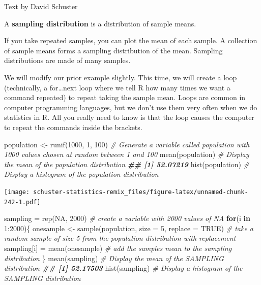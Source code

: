 \documentclass[
]{book}
\newenvironment{Shaded}{\begin{snugshade}}{\end{snugshade}}
\newcommand{\AttributeTok}[1]{\textcolor[rgb]{0.77,0.63,0.00}{#1}}
\newcommand{\CommentTok}[1]{\textcolor[rgb]{0.56,0.35,0.01}{\textit{#1}}}
\newcommand{\ConstantTok}[1]{\textcolor[rgb]{0.00,0.00,0.00}{#1}}
\newcommand{\ControlFlowTok}[1]{\textcolor[rgb]{0.13,0.29,0.53}{\textbf{#1}}}
\newcommand{\DecValTok}[1]{\textcolor[rgb]{0.00,0.00,0.81}{#1}}
\newcommand{\DocumentationTok}[1]{\textcolor[rgb]{0.56,0.35,0.01}{\textbf{\textit{#1}}}}
\newcommand{\FunctionTok}[1]{\textcolor[rgb]{0.00,0.00,0.00}{#1}}
\newcommand{\NormalTok}[1]{#1}
\newcommand{\OtherTok}[1]{\textcolor[rgb]{0.56,0.35,0.01}{#1}}
\newcommand{\SpecialCharTok}[1]{\textcolor[rgb]{0.00,0.00,0.00}{#1}}
\begin{document}
Text by David Schuster

A \textbf{sampling distribution} is a distribution of sample means.

If you take repeated samples, you can plot the mean of each sample. A collection of sample means forms a sampling distribution of the mean. Sampling distributions are made of many samples.

We will modify our prior example slightly. This time, we will create a loop (technically, a for\ldots next loop where we tell R how many times we want a command repeated) to repeat taking the sample mean. Loops are common in computer programming languages, but we don't use them very often when we do statistics in R. All you really need to know is that the loop causes the computer to repeat the commands inside the brackets.

\begin{Shaded}
\begin{Highlighting}[]
\NormalTok{population }\OtherTok{\textless{}{-}} \FunctionTok{runif}\NormalTok{(}\DecValTok{1000}\NormalTok{, }\DecValTok{1}\NormalTok{, }\DecValTok{100}\NormalTok{) }\CommentTok{\# Generate a variable called \textquotesingle{}population\textquotesingle{} with 1000 values chosen at random between 1 and 100}
\FunctionTok{mean}\NormalTok{(population) }\CommentTok{\# Display the mean of the population distribution}
\DocumentationTok{\#\# [1] 52.07219}
\FunctionTok{hist}\NormalTok{(population) }\CommentTok{\# Display a histogram of the population distribution}
\end{Highlighting}
\end{Shaded}

\texttt{[image: schuster-statistics-remix\_files/figure-latex/unnamed-chunk-242-1.pdf]}

\begin{Shaded}
\begin{Highlighting}[]

\NormalTok{sampling }\OtherTok{=} \FunctionTok{rep}\NormalTok{(}\ConstantTok{NA}\NormalTok{, }\DecValTok{2000}\NormalTok{) }\CommentTok{\# create a variable with 2000 values of NA}
\ControlFlowTok{for}\NormalTok{(i }\ControlFlowTok{in} \DecValTok{1}\SpecialCharTok{:}\DecValTok{2000}\NormalTok{)\{}
\NormalTok{  onesample }\OtherTok{\textless{}{-}} \FunctionTok{sample}\NormalTok{(population, }\AttributeTok{size =} \DecValTok{5}\NormalTok{, }\AttributeTok{replace =} \ConstantTok{TRUE}\NormalTok{) }\CommentTok{\# take a random sample of size 5 from the population distribution with replacement  }
\NormalTok{  sampling[i] }\OtherTok{=} \FunctionTok{mean}\NormalTok{(onesample) }\CommentTok{\# add the sample\textquotesingle{}s mean to the sampling distribution}
\NormalTok{\}}
\FunctionTok{mean}\NormalTok{(sampling) }\CommentTok{\# Display the mean of the SAMPLING distribution}
\DocumentationTok{\#\# [1] 52.17503}
\FunctionTok{hist}\NormalTok{(sampling) }\CommentTok{\# Display a histogram of the SAMPLING distribution}
\end{Highlighting}
\end{Shaded}
\end{document}
